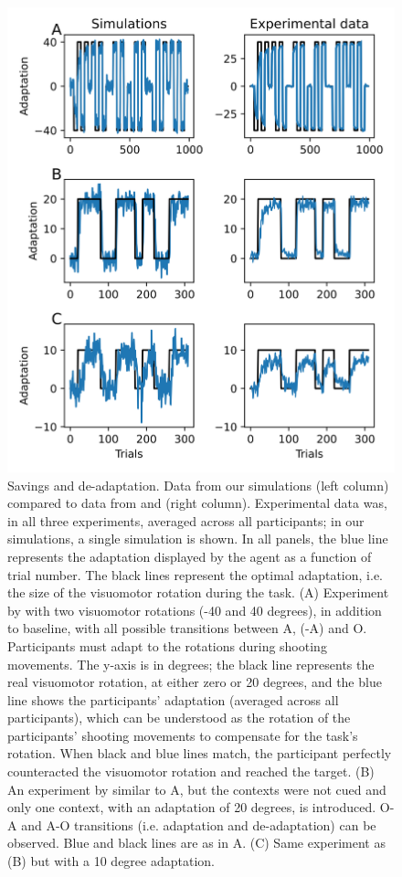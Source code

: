 \documentclass[a4paper,doc,floatsintext,natbib]{apa6}
\begin{document}
\begin{figure}
\centering
\includegraphics{./figures/figure_2.png}
\caption{Savings and de-adaptation. Data from our simulations (left column) compared to data from \cite{Kim_Neural_2015} and \cite{Oh_Minimizing_2019} (right column). Experimental data was, in all three experiments, averaged across all participants; in our simulations, a single simulation is shown. In all panels, the blue line represents the adaptation displayed by the agent as a function of trial number. The black lines represent the optimal adaptation, i.e. the size of the visuomotor rotation during the task. (A) Experiment by \cite{Kim_Neural_2015} with two visuomotor rotations (-40 and 40 degrees), in addition to baseline, with all possible transitions between A, (-A) and O. Participants must adapt to the rotations during shooting movements. The y-axis is in degrees; the black line represents the real visuomotor rotation, at either zero or 20 degrees, and the blue line shows the participants' adaptation (averaged across all participants), which can be understood as the rotation of the participants' shooting movements to compensate for the task's rotation. When black and blue lines match, the participant perfectly counteracted the visuomotor rotation and reached the target. (B) An experiment by \cite{Oh_Minimizing_2019} similar to A, but the contexts were not cued and only one context, with an adaptation of 20 degrees, is introduced. O-A and A-O transitions (i.e. adaptation and de-adaptation) can be observed. Blue and black lines are as in A. (C) Same experiment as (B) but with a 10 degree adaptation.} \label{fig:oh-2019}
\end{figure}
\end{document}
